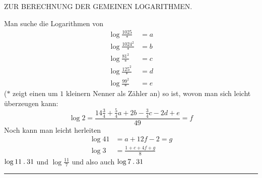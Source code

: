 \clearpage
{}%
\renewcommand{\BookRunningTitle}{Zur Berechnung der gemeinen Logarithmen}
\begin{center}\Large ZUR BERECHNUNG DER GEMEINEN LOGARITHMEN.\end{center}
Man suche die Logarithmen von
\[
\begin{aligned}
\log\frac{1025}{*}&=a\\
\log\frac{1024^2}{*}&=b\\
\log\frac{81^2}{*}&=c\\
\log\frac{125^2}{*}&=d\\
\log\frac{99^2}{*}&=e
\end{aligned}
\]
($*$ zeigt einen um $1$ kleinern Nenner als Zähler an) so ist, wovon man sich leicht überzeugen kann:
\[
\log 2=\frac{14\frac34+\frac54a+2b-\frac34c-2d+e}{49}=f
\]
Noch kann man leicht herleiten
\[
\begin{aligned}
\log 41&=a+12f-2=g\\
\log 3&=\frac{1+c+4f+g}{8}
\end{aligned}
\]
$\log 11\mathbin{.}31$ und $\log\frac{11}{7}$ und also auch $\log 7\mathbin{.}31$\par\medskip\noindent\rule{.32\textwidth}{.3pt}
